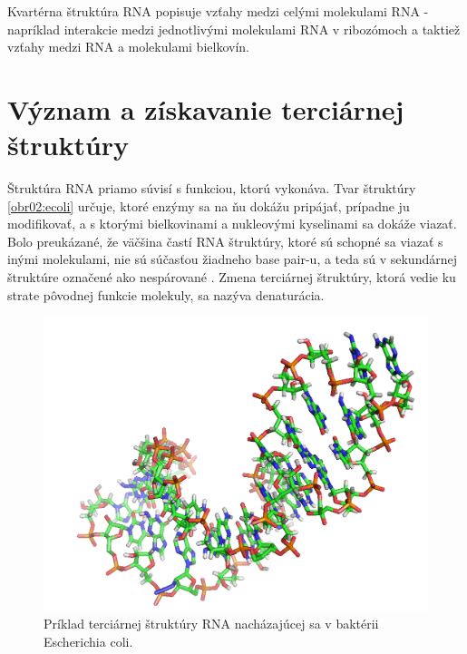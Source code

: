 \indent Kvartérna štruktúra RNA popisuje vzťahy medzi celými molekulami RNA - napríklad interakcie medzi jednotlivými molekulami RNA v ribozómoch \cite{Noller84} a taktiež vzťahy medzi RNA a molekulami bielkovín.

\section{Význam a získavanie terciárnej štruktúry}
Štruktúra RNA priamo súvisí s funkciou, ktorú vykonáva. Tvar štruktúry \autoref{obr02:ecoli} určuje, ktoré enzýmy sa na ňu dokážu pripájať, prípadne ju modifikovať, a s ktorými bielkovinami a nukleovými kyselinami sa dokáže viazať. Bolo preukázané, že väčšina častí RNA štruktúry, ktoré sú schopné sa viazať s inými molekulami, nie sú súčasťou žiadneho base pair-u, a teda sú v sekundárnej štruktúre označené ako nespárované \cite{Schudoma10}. Zmena terciárnej štruktúry, ktorá vedie ku strate pôvodnej funkcie molekuly, sa nazýva denaturácia.

\begin{figure}%
\includegraphics[width=\textwidth]{../img/ecoli_rna_example}
\caption{Príklad terciárnej štruktúry RNA nacházajúcej sa v baktérii Escherichia coli.}
\label{obr02:ecoli}
\end{figure}



